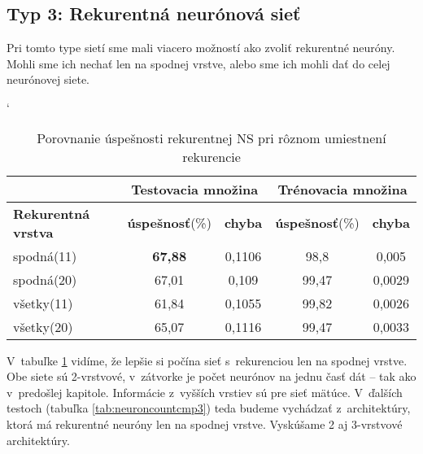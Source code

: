 \subsection{Typ 3: Rekurentná neurónová sieť}
Pri tomto type sietí sme mali viacero možností ako zvoliť rekurentné neuróny. Mohli sme ich nechať len na spodnej vrstve, alebo sme ich mohli dať do celej neurónovej siete.

\begin{table}[htp]
\catcode` %
\centering
\begin{tabular}{|l|c|c|c|c|}
\cline{2-5}
\multicolumn{1}{l}{} & \multicolumn{2}{|c|}{\textbf{Testovacia množina}} & \multicolumn{2}{c|}{\textbf{Trénovacia množina}} \\ 
\hline
\textbf{Rekurentná vrstva} & \textbf{úspešnosť}(\%) & \textbf{chyba} & \textbf{úspešnosť}(\%) & \textbf{chyba}  \\ \hline
spodná(11) &  \textbf{67,88} & 0,1106 & 98,8 & 0,005  \\ \hline
spodná(20) & 67,01 & 0,109 & 99,47 & 0,0029  \\ \hline
všetky(11) & 61,84 & 0,1055 & 99,82 & 0,0026  \\ \hline
všetky(20) & 65,07 & 0,1116 & 99,47 & 0,0033  \\ \hline
\end{tabular}
\caption{Porovnanie úspešnosti rekurentnej NS pri rôznom umiestnení rekurencie}
\label{tab:reclayercmp}
\end{table}

V~tabuľke \ref{tab:reclayercmp} vidíme, že lepšie si počína sieť s~rekurenciou len na spodnej vrstve. Obe siete sú 2-vrstvové, v~zátvorke je počet neurónov na jednu časť dát -- tak ako v~predošlej kapitole. Informácie z~vyšších vrstiev sú pre sieť mätúce. V~ďalších testoch (tabuľka \ref{tab:neuroncountcmp3}) teda budeme vychádzať z~architektúry, ktorá má rekurentné neuróny len na spodnej vrstve. Vyskúšame 2 aj 3-vrstvové architektúry.

